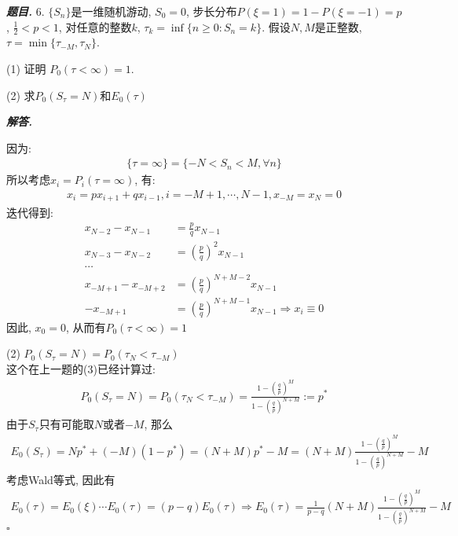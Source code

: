 \documentclass[10pt, a4paper, oneside]{ctexart}
\newenvironment{problem}{\begin{framed}\par\noindent\textbf{\textit{题目. }}}{\end{framed}\par}
\newenvironment{solution}{%
  \par\noindent\textbf{\textit{解答. }}\ignorespaces
}{%
  \hfill\ensuremath{\square}\par %
}
\begin{document}
\begin{problem}
    6. $\{S_n\}$是一维随机游动, $S_0=0$, 步长分布$P(\xi=1)=1-P(\xi=-1)=p$, $\frac{1}{2}<p<1$, 对任意的整数$k$, $\tau_k=\inf\{n\geq 0 : S_n=k\}$. 假设$N,M$是正整数, $\tau=\min\{\tau_{-M},\tau_{N}\}$.

    (1) 证明 $P_0(\tau<\infty)=1$.

    (2) 求$P_0(S_{\tau}=N)$和$E_0(\tau)$
\end{problem}

\begin{solution}
因为:
\begin{align*}
    \{\tau=\infty\}=\{-N<S_n<M,\forall n\}
\end{align*}
所以考虑$x_i=P_i(\tau=\infty)$, 有:
\begin{align*}
    x_i=px_{i+1}+qx_{i-1}, i=-M+1,\cdots,N-1, x_{-M}=x_{N}=0
\end{align*}
迭代得到:
\begin{align*}
    x_{N-2}-x_{N-1}&=\frac{p}{q}x_{N-1}\\
    x_{N-3}-x_{N-2}&=(\frac{p}{q})^2x_{N-1}\\
    \cdots&\\
    x_{-M+1}-x_{-M+2}&=(\frac{p}{q})^{N+M-2}x_{N-1}\\
    -x_{-M+1}&=(\frac{p}{q})^{N+M-1}x_{N-1} \Rightarrow x_i\equiv 0
\end{align*}
因此, $x_0=0$, 从而有$P_0(\tau<\infty)=1$

(2) $P_0(S_{\tau}=N)=P_0(\tau_N<\tau_{-M})$\\
这个在上一题的(3)已经计算过:
\begin{align*}
    P_0(S_{\tau}=N)=P_0(\tau_N<\tau_{-M})=\frac{1-(\frac{q}{p})^M}{1-(\frac{q}{p})^{N+M}}:=p^*
\end{align*}
由于$S_{\tau}$只有可能取$N$或者$-M$, 那么
\begin{align*}
    E_0(S_\tau)=Np^*+(-M)(1-p^*)=(N+M)p^*-M=(N+M)\frac{1-(\frac{q}{p})^M}{1-(\frac{q}{p})^{N+M}}-M
\end{align*}
考虑Wald等式, 因此有
\begin{align*}
    E_0(\tau)=E_0(\xi)\cdots E_0(\tau)=(p-q)E_0(\tau)\Rightarrow E_0(\tau)=\frac{1}{p-q}(N+M)\frac{1-(\frac{q}{p})^M}{1-(\frac{q}{p})^{N+M}}-M
\end{align*}
\end{solution}
\end{document}
